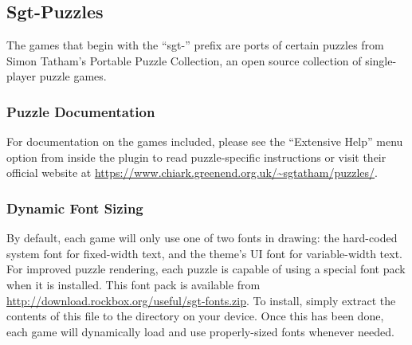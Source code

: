 \subsection{Sgt-Puzzles}

The games that begin with the ``sgt-'' prefix are ports of certain
puzzles from Simon Tatham's Portable Puzzle Collection, an open source
collection of single-player puzzle games.

\subsubsection{Puzzle Documentation}
For documentation on the games included, please see the ``Extensive
Help'' menu option from inside the plugin to read puzzle-specific
instructions or visit their official website at
\url{https://www.chiark.greenend.org.uk/~sgtatham/puzzles/}.

\subsubsection{Dynamic Font Sizing}
By default, each game will only use one of two fonts in drawing: the
hard-coded system font for fixed-width text, and the theme's UI font
for variable-width text. For improved puzzle rendering, each puzzle is
capable of using a special font pack when it is installed. This font
pack is available from
\url{http://download.rockbox.org/useful/sgt-fonts.zip}. To install,
simply extract the contents of this file to the
 directory on your device. Once this has been
done, each game will dynamically load and use properly-sized fonts
whenever needed.

